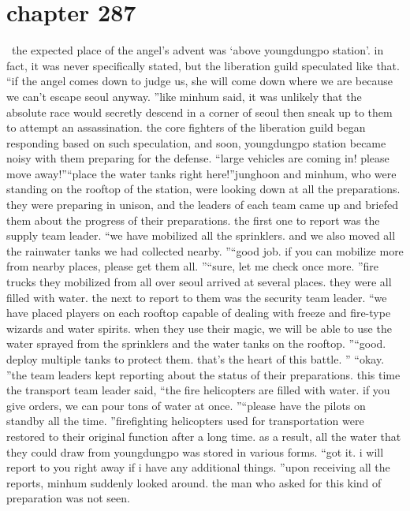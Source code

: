 \section{chapter 287}






 the expected place of the angel’s advent was ‘above youngdungpo station’.
 in fact, it was never specifically stated, but the liberation guild speculated like that.
“if the angel comes down to judge us, she will come down where we are because we can’t escape seoul anyway.
”like minhum said, it was unlikely that the absolute race would secretly descend in a corner of seoul then sneak up to them to attempt an assassination.
the core fighters of the liberation guild began responding based on such speculation, and soon, youngdungpo station became noisy with them preparing for the defense.
“large vehicles are coming in! please move away!”“place the water tanks right here!”junghoon and minhum, who were standing on the rooftop of the station, were looking down at all the preparations.
 they were preparing in unison, and the leaders of each team came up and briefed them about the progress of their preparations.
the first one to report was the supply team leader.
“we have mobilized all the sprinklers.
 and we also moved all the rainwater tanks we had collected nearby.
”“good job.
 if you can mobilize more from nearby places, please get them all.
”“sure, let me check once more.
”fire trucks they mobilized from all over seoul arrived at several places.
 they were all filled with water.
the next to report to them was the security team leader.
“we have placed players on each rooftop capable of dealing with freeze and fire-type wizards and water spirits.
 when they use their magic, we will be able to use the water sprayed from the sprinklers and the water tanks on the rooftop.
”“good.
 deploy multiple tanks to protect them.
 that’s the heart of this battle.
”
“okay.
”the team leaders kept reporting about the status of their preparations.
this time the transport team leader said, “the fire helicopters are filled with water.
 if you give orders, we can pour tons of water at once.
”“please have the pilots on standby all the time.
”firefighting helicopters used for transportation were restored to their original function after a long time.
as a result, all the water that they could draw from youngdungpo was stored in various forms.
“got it.
 i will report to you right away if i have any additional things.
”upon receiving all the reports, minhum suddenly looked around.
 the man who asked for this kind of preparation was not seen.
